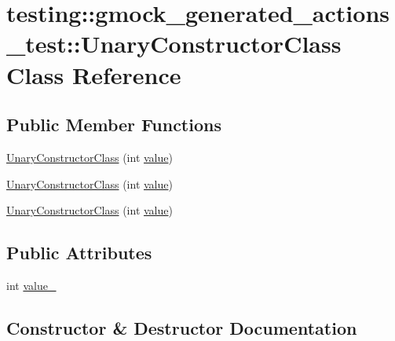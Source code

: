 \hypertarget{classtesting_1_1gmock__generated__actions__test_1_1_unary_constructor_class}{}\section{testing\+::gmock\+\_\+generated\+\_\+actions\+\_\+test\+::Unary\+Constructor\+Class Class Reference}
\label{classtesting_1_1gmock__generated__actions__test_1_1_unary_constructor_class}
\subsection*{Public Member Functions}
\begin{DoxyCompactItemize}
\item 
\mbox{\hyperlink{classtesting_1_1gmock__generated__actions__test_1_1_unary_constructor_class_a35b2c0aab3928c1d558c11b6652a7262}{Unary\+Constructor\+Class}} (int \mbox{\hyperlink{_obj__test_2lib_2googletest-master_2googlemock_2test_2gmock-matchers__test_8cc_a337b8a670efc0b086ad3af163f3121b6}{value}})
\item 
\mbox{\hyperlink{classtesting_1_1gmock__generated__actions__test_1_1_unary_constructor_class_a35b2c0aab3928c1d558c11b6652a7262}{Unary\+Constructor\+Class}} (int \mbox{\hyperlink{_obj__test_2lib_2googletest-master_2googlemock_2test_2gmock-matchers__test_8cc_a337b8a670efc0b086ad3af163f3121b6}{value}})
\item 
\mbox{\hyperlink{classtesting_1_1gmock__generated__actions__test_1_1_unary_constructor_class_a35b2c0aab3928c1d558c11b6652a7262}{Unary\+Constructor\+Class}} (int \mbox{\hyperlink{_obj__test_2lib_2googletest-master_2googlemock_2test_2gmock-matchers__test_8cc_a337b8a670efc0b086ad3af163f3121b6}{value}})
\end{DoxyCompactItemize}
\subsection*{Public Attributes}
\begin{DoxyCompactItemize}
\item 
int \mbox{\hyperlink{classtesting_1_1gmock__generated__actions__test_1_1_unary_constructor_class_a5e96ce337c5eb7016eba2ea66ae46851}{value\+\_\+}}
\end{DoxyCompactItemize}


\subsection{Constructor \& Destructor Documentation}
\mbox{\label{classtesting_1_1gmock__generated__actions__test_1_1_unary_constructor_class_a35b2c0aab3928c1d558c11b6652a7262}} 
